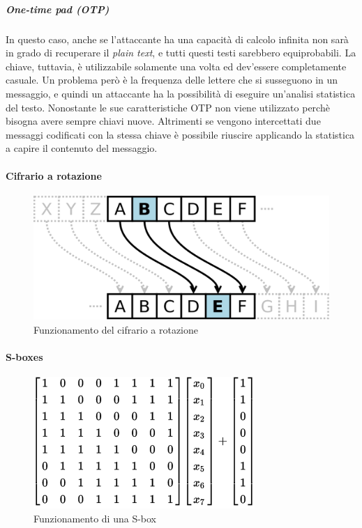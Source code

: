 \subparagraph*{One-time pad (OTP)}
In questo caso, anche se l'attaccante ha una capacità di calcolo infinita non 
sarà in grado di recuperare il \textit{plain text}, e tutti questi testi 
sarebbero equiprobabili. 
La chiave, tuttavia, è utilizzabile solamente una volta ed dev'essere 
completamente casuale.
Un problema però è la frequenza delle lettere che si susseguono in un messaggio, 
e quindi un attaccante ha la possibilità di eseguire un'analisi statistica del 
testo.
Nonostante le sue caratteristiche OTP non viene utilizzato perchè bisogna avere 
sempre chiavi nuove. Altrimenti se vengono intercettati due messaggi codificati 
con la stessa chiave è possibile riuscire applicando la statistica a capire il 
contenuto del messaggio.

\paragraph{Cifrario a rotazione}

\begin{figure}[H]
\centering
\includegraphics[scale=0.2]{res/img/caesar.png}
\caption{Funzionamento del cifrario a rotazione}
\label{fig:password:caesar}
\end{figure}

\paragraph{S-boxes}

\begin{figure}[H]
\centering
\includegraphics[scale=0.5]{res/img/sboxes.png}
\caption{Funzionamento di una S-box}
\label{fig:password:sboxes}
\end{figure}

